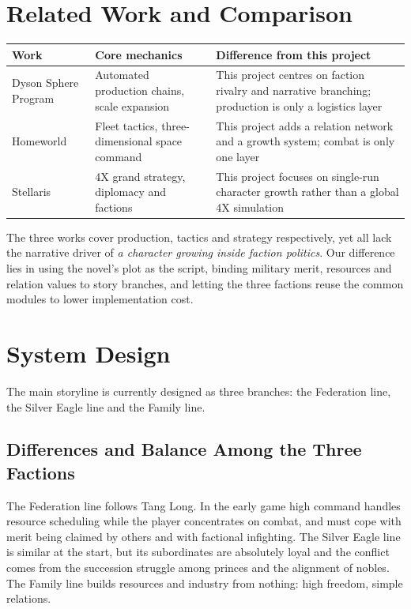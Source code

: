 \documentclass[11pt,a4paper]{article}
\begin{document}
\section{Related Work and Comparison}

\begin{table}[h]
\centering
\small
\begin{tabular}{@{}>{\raggedright\arraybackslash}p{}>{\raggedright\arraybackslash}p{}>{\raggedright\arraybackslash}p{}@{}}
\toprule
Work & Core mechanics & Difference from this project \\
\midrule
Dyson Sphere Program & Automated production chains, scale expansion &
This project centres on faction rivalry and narrative branching; production is only a logistics layer \\
Homeworld & Fleet tactics, three-dimensional space command &
This project adds a relation network and a growth system; combat is only one layer \\
Stellaris & 4X grand strategy, diplomacy and factions &
This project focuses on single-run character growth rather than a global 4X simulation \\
\bottomrule
\end{tabular}
\end{table}

The three works cover production, tactics and strategy respectively, yet all lack the narrative
driver of \emph{a character growing inside faction politics}. Our difference lies in using the
novel's plot as the script, binding military merit, resources and relation values to story branches,
and letting the three factions reuse the common modules to lower implementation cost.

\section{System Design}
The main storyline is currently designed as three branches: the Federation line, the Silver Eagle
line and the Family line.

\subsection{Differences and Balance Among the Three Factions}
The Federation line follows Tang Long. In the early game high command handles resource scheduling
while the player concentrates on combat, and must cope with merit being claimed by others and with
factional infighting. The Silver Eagle line is similar at the start, but its subordinates are
absolutely loyal and the conflict comes from the succession struggle among princes and the
alignment of nobles. The Family line builds resources and industry from nothing: high freedom,
simple relations.
\end{document}
